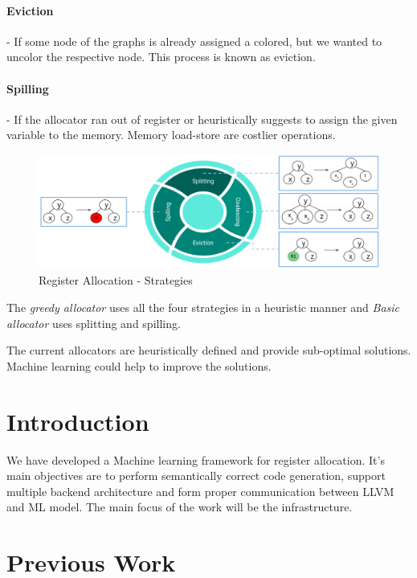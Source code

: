 \paragraph{Eviction} - If some node of the graphs is already assigned a colored, but we wanted to uncolor the respective node. This process is known as eviction.

\paragraph{Spilling} - If the allocator ran out of register or heuristically suggests to assign the given variable to the memory. Memory load-store are costlier operations.

\begin{figure}[t]
    \centering
    \includegraphics[scale=0.4]{figures/chapter-5/mlra_strategies.png}
    \caption{Register Allocation - Strategies}
     \label{fig:mlra-strat}
\end{figure}

The \textit{greedy allocator} uses all the four strategies in a heuristic manner and \textit{Basic allocator} uses splitting and spilling.

The current allocators are heuristically defined and provide sub-optimal solutions. Machine learning could help to improve the solutions.

\section{Introduction}\label{sec:mlra:intro}
We have developed a Machine learning framework for register allocation. It's main objectives are to perform semantically correct code generation, support multiple backend architecture and form proper communication between LLVM and ML model. The main focus of the work will be the infrastructure.

\section{Previous Work}\label{sec:mlra:pre_work}


